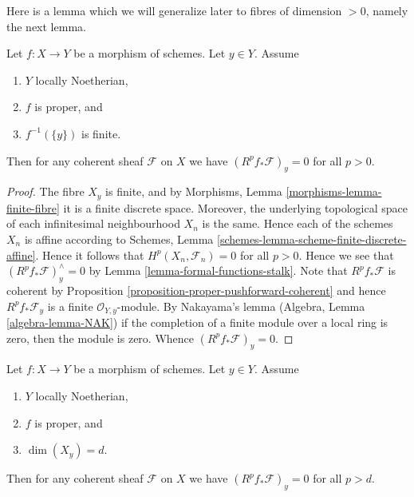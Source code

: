 \noindent
Here is a lemma which we will generalize later to fibres of
dimension $ > 0$, namely the next lemma.

\begin{lemma}
\label{lemma-higher-direct-images-zero-finite-fibre}
Let $f : X \to Y$ be a morphism of schemes.
Let $y \in Y$.
Assume
\begin{enumerate}
\item $Y$ locally Noetherian,
\item $f$ is proper, and
\item $f^{-1}(\{y\})$ is finite.
\end{enumerate}
Then for any coherent sheaf $\mathcal{F}$ on $X$ we have
$(R^pf_*\mathcal{F})_y = 0$ for all $p > 0$.
\end{lemma}

\begin{proof}
The fibre $X_y$ is finite, and by
Morphisms, Lemma \ref{morphisms-lemma-finite-fibre} it
is a finite discrete space. Moreover, the underlying topological
space of each infinitesimal neighbourhood $X_n$ is the same.
Hence each of the schemes $X_n$ is affine according to
Schemes, Lemma \ref{schemes-lemma-scheme-finite-discrete-affine}.
Hence it follows that $H^p(X_n, \mathcal{F}_n) = 0$ for all
$p > 0$. Hence we see that $(R^pf_*\mathcal{F})_y^\wedge = 0$
by Lemma \ref{lemma-formal-functions-stalk}.
Note that $R^pf_*\mathcal{F}$ is coherent by
Proposition \ref{proposition-proper-pushforward-coherent} and
hence $R^pf_*\mathcal{F}_y$ is a finite
$\mathcal{O}_{Y, y}$-module. By Nakayama's lemma
(Algebra, Lemma \ref{algebra-lemma-NAK})
if the completion of a finite module over a local ring
is zero, then the module is zero. Whence
$(R^pf_*\mathcal{F})_y = 0$.
\end{proof}

\begin{lemma}
\label{lemma-higher-direct-images-zero-above-dimension-fibre}
Let $f : X \to Y$ be a morphism of schemes.
Let $y \in Y$.
Assume
\begin{enumerate}
\item $Y$ locally Noetherian,
\item $f$ is proper, and
\item $\dim(X_y) = d$.
\end{enumerate}
Then for any coherent sheaf $\mathcal{F}$ on $X$ we have
$(R^pf_*\mathcal{F})_y = 0$ for all $p > d$.
\end{lemma}

